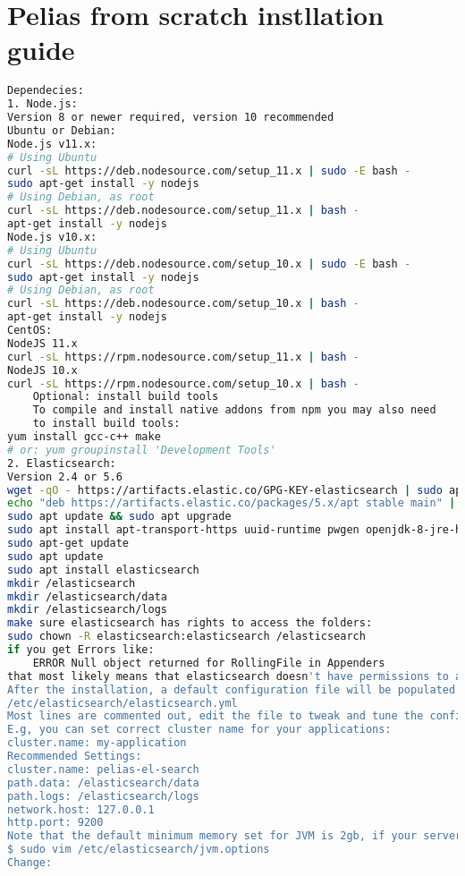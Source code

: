 \section{Pelias from scratch instllation guide} \label{Pfsig}
\begin{lstlisting}[language=bash,breaklines=true]
Dependecies:
1. Node.js:
Version 8 or newer required, version 10 recommended 
Ubuntu or Debian:
Node.js v11.x:
# Using Ubuntu
curl -sL https://deb.nodesource.com/setup_11.x | sudo -E bash -
sudo apt-get install -y nodejs
# Using Debian, as root
curl -sL https://deb.nodesource.com/setup_11.x | bash -
apt-get install -y nodejs
Node.js v10.x:
# Using Ubuntu
curl -sL https://deb.nodesource.com/setup_10.x | sudo -E bash -
sudo apt-get install -y nodejs
# Using Debian, as root
curl -sL https://deb.nodesource.com/setup_10.x | bash -
apt-get install -y nodejs
CentOS:
NodeJS 11.x
curl -sL https://rpm.nodesource.com/setup_11.x | bash -
NodeJS 10.x
curl -sL https://rpm.nodesource.com/setup_10.x | bash -
	Optional: install build tools
	To compile and install native addons from npm you may also need 
	to install build tools:
yum install gcc-c++ make
# or: yum groupinstall 'Development Tools'
2. Elasticsearch:
Version 2.4 or 5.6
wget -qO - https://artifacts.elastic.co/GPG-KEY-elasticsearch | sudo apt-key add -
echo "deb https://artifacts.elastic.co/packages/5.x/apt stable main" | sudo tee -a /etc/apt/sources.list.d/elastic-5.x.list
sudo apt update && sudo apt upgrade
sudo apt install apt-transport-https uuid-runtime pwgen openjdk-8-jre-headless
sudo apt-get update
sudo apt update
sudo apt install elasticsearch
mkdir /elasticsearch
mkdir /elasticsearch/data
mkdir /elasticsearch/logs
make sure elasticsearch has rights to access the folders:
sudo chown -R elasticsearch:elasticsearch /elasticsearch
if you get Errors like:
	ERROR Null object returned for RollingFile in Appenders
that most likely means that elasticsearch doesn't have permissions to access the logs and data folders.
After the installation, a default configuration file will be populated to 
/etc/elasticsearch/elasticsearch.yml
Most lines are commented out, edit the file to tweak and tune the configuration.
E.g, you can set correct cluster name for your applications:
cluster.name: my-application
Recommended Settings:
cluster.name: pelias-el-search
path.data: /elasticsearch/data
path.logs: /elasticsearch/logs
network.host: 127.0.0.1
http.port: 9200
Note that the default minimum memory set for JVM is 2gb, if your server has small memory size, change this value:
$ sudo vim /etc/elasticsearch/jvm.options
Change:

\end{lstlisting}

